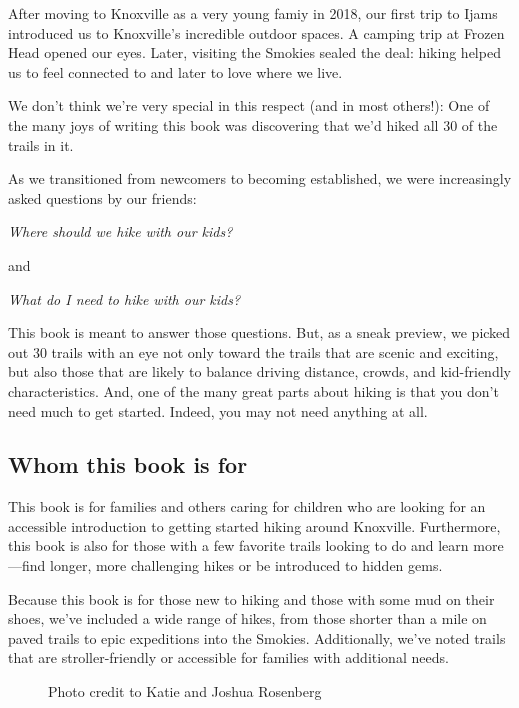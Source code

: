 \documentclass[
  letterpaper,
  DIV=11,
  numbers=noendperiod]{scrreprt}
\makeatletter
\newcommand*\pandocbounded[1]{%
  \sbox\pandoc@box{#1}%
  \Gscale@div\@tempa{\textheight}{\dimexpr\ht\pandoc@box+\dp\pandoc@box\relax}%
  \Gscale@div\@tempb{\linewidth}{\wd\pandoc@box}%
  \ifdim\@tempb\p@<\@tempa\p@\let\@tempa\@tempb\fi%
  \ifdim\@tempa\p@<\p@\scalebox{\@tempa}{\usebox\pandoc@box}%
  \else\usebox{\pandoc@box}%
  \fi%
}
\makeatother
\begin{document}
After moving to Knoxville as a very young famiy in 2018, our first trip
to Ijams introduced us to Knoxville's incredible outdoor spaces. A
camping trip at Frozen Head opened our eyes. Later, visiting the Smokies
sealed the deal: hiking helped us to feel connected to and later to love
where we live.

We don't think we're very special in this respect (and in most others!):
One of the many joys of writing this book was discovering that we'd
hiked all 30 of the trails in it.

As we transitioned from newcomers to becoming established, we were
increasingly asked questions by our friends:

\emph{Where should we hike with our kids?}

and

\emph{What do I need to hike with our kids?}

This book is meant to answer those questions. But, as a sneak preview,
we picked out 30 trails with an eye not only toward the trails that are
scenic and exciting, but also those that are likely to balance driving
distance, crowds, and kid-friendly characteristics. And, one of the many
great parts about hiking is that you don't need much to get started.
Indeed, you may not need anything at all.

\subsection{Whom this book is for}\label{whom-this-book-is-for}

This book is for families and others caring for children who are looking
for an accessible introduction to getting started hiking around
Knoxville. Furthermore, this book is also for those with a few favorite
trails looking to do and learn more---find longer, more challenging
hikes or be introduced to hidden gems.

Because this book is for those new to hiking and those with some mud on
their shoes, we've included a wide range of hikes, from those shorter
than a mile on paved trails to epic expeditions into the Smokies.
Additionally, we've noted trails that are stroller-friendly or
accessible for families with additional needs.

\begin{figure}[H]

{\centering \pandocbounded{\texttt{[image: img/ayla-flowers.jpg]}}

}

\caption{Photo credit to Katie and Joshua Rosenberg}

\end{figure}%
\end{document}
